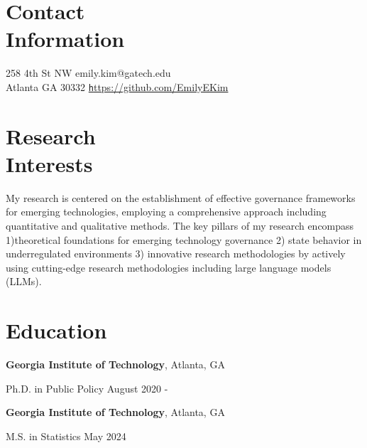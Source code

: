 \documentclass[margin,line, 10pt]{res}
\begin{document}

\begin{resume}

\section{\sc Contact \\Information}
258 4th St NW \hfill {emily.kim@gatech.edu}\\
Atlanta GA 30332  \hfill \href{https://github.com/EmilyEKim/CV.git/}{\texttt https://github.com/EmilyEKim}


\section{\sc Research\\ Interests}
My research is centered on the establishment of effective governance frameworks for emerging technologies, employing a comprehensive approach including quantitative and qualitative methods. The key pillars of my research encompass 1)theoretical foundations for emerging technology governance 2) state behavior in underregulated environments 3) innovative research methodologies by actively using cutting-edge research methodologies including large language models (LLMs).

\section{Education}
\textbf{Georgia Institute of Technology}, Atlanta, GA

\vspace{-0.4cm}
Ph.D. in Public Policy \hfill {August 2020 - }

\textbf{Georgia Institute of Technology}, Atlanta, GA

\vspace{-0.4cm}
M.S. in Statistics \hfill {May 2024}


\end{resume}
\end{document}
